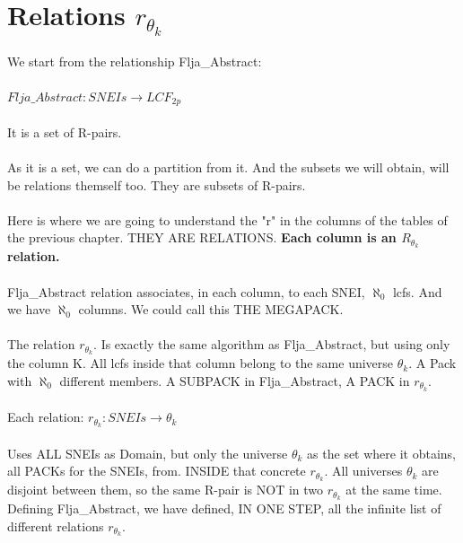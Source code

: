 \chapter{Relations $r_{\theta_{k}}$}

	\noindent
	We start from the relationship Flja\_Abstract:\\\\
	$Flja\_Abstract: SNEIs \rightarrow LCF_{2p}$\\\\
	It is a set of R-pairs.
	\\\\
	
	\noindent
	As it is a set, we can do a partition from it. And the subsets we will obtain, will be relations themself too. They are subsets of R-pairs.
	\\\\
	
	\noindent
	Here is where we are going to understand the "r" in the columns of the tables of the previous chapter. THEY ARE RELATIONS. \textbf{Each column is an $R_{\theta_{k}}$ relation.}
	\\\\
	
	\noindent
	Flja\_Abstract relation associates, in each column, to each SNEI, $\aleph_{0}$ lcfs. And we have $\aleph_{0}$ columns. We could call this THE MEGAPACK.
	\\\\
	
	\noindent
	The relation $r_{\theta_{k}}$. Is exactly the same algorithm as Flja\_Abstract, but using only the column K. All lcfs inside that column belong to the same universe $\theta_{k}$. A Pack with $\aleph_{0}$ different members. A SUBPACK in Flja\_Abstract, A PACK in $r_{\theta_{k}}$.
	\\\\
	
	\noindent
	Each relation:  $r_{\theta_{k}}: SNEIs \rightarrow \theta_{k}$\\\\
	Uses ALL SNEIs as Domain, but only the universe $\theta_{k}$ as the set where it obtains, all PACKs for the SNEIs, from. INSIDE that concrete $r_{\theta_{k}}$. All universes $\theta_{k}$ are disjoint between them, so the same R-pair is NOT in two $r_{\theta_{k}}$ at the same time. Defining Flja\_Abstract, we have defined, IN ONE STEP, all the infinite list of different relations $r_{\theta_{k}}$.
	\\\\
	
